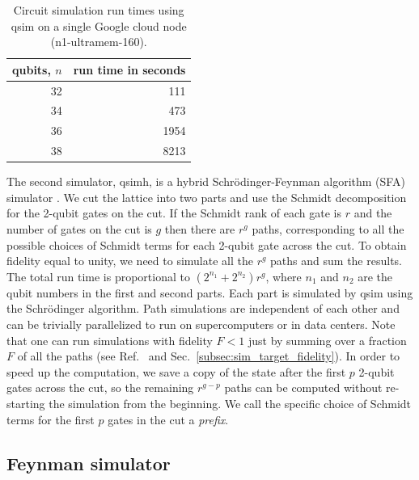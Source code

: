 \begin{table}
\begin{tabular}{| r | r |}
\hline
qubits, $n$ & run time in seconds \\
\hline
32 & 111 \\
\hline
34 & 473 \\
\hline
36 & 1954 \\
\hline
38 & 8213 \\
\hline
\end{tabular}
\label{table:qsimruntimes}
\caption{Circuit simulation run times using qsim on a single Google cloud node (n1-ultramem-160).}
\end{table}

The second simulator, qsimh, is a hybrid Schr\"{o}dinger-Feynman algorithm (SFA) simulator \cite{markov_quantum_2018}. We cut the lattice into two parts and use the Schmidt decomposition for the 2-qubit gates on the cut. If the Schmidt rank of each gate is $r$ and the number of gates on the cut is $g$ then there are $r^g$ paths, corresponding to all the possible choices of Schmidt terms for each 2-qubit gate across the cut. To obtain fidelity equal to unity, we need to simulate all the $r^g$ paths and sum the results. The total run time is proportional to $(2^{n_1}+2^{n_2})r^g$, where $n_1$ and $n_2$ are the qubit numbers in the first and second parts. Each part is simulated by qsim using the Schr\"odinger algorithm. Path simulations are independent of each other and can be trivially parallelized to run on supercomputers or in data centers. Note that one can run simulations with fidelity $F < 1$ just by summing over a fraction $F$ of all the paths (see Ref.~\cite{markov_quantum_2018} and Sec.~\ref{subsec:sim_target_fidelity}). In order to speed up the computation, we save a copy of the state after the first $p$ 2-qubit gates across the cut, so the remaining $r^{g-p}$ paths can be computed without re-starting the simulation from the beginning. We call the specific choice of Schmidt terms for the first $p$ gates in the cut a {\it prefix}.

\subsection{Feynman simulator}
\label{subsec:fa}

